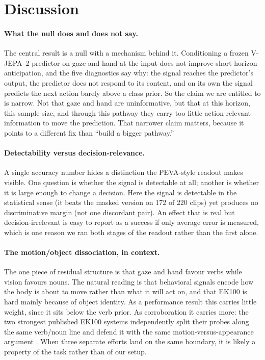 \section{Discussion}

\paragraph{What the null does and does not say.}
The central result is a null with a mechanism behind it. Conditioning a frozen
V-JEPA~2 predictor on gaze and hand at the input does not improve short-horizon
anticipation, and the five diagnostics say why: the signal reaches the
predictor's output, the predictor does not respond to its content, and on its own
the signal predicts the next action barely above a class prior. So the claim we
are entitled to is narrow. Not that gaze and hand are uninformative, but that at
this horizon, this sample size, and through this pathway they carry too little
action-relevant information to move the prediction. That narrower claim matters,
because it points to a different fix than ``build a bigger pathway.''

\paragraph{Detectability versus decision-relevance.}
A single accuracy number hides a distinction the PEVA-style readout makes
visible. One question is whether the signal is detectable at all; another is
whether it is large enough to change a decision. Here the signal is detectable in
the statistical sense (it beats the masked version on 172 of 220 clips) yet
produces no discriminative margin (not one discordant pair). An effect that is
real but decision-irrelevant is easy to report as a success if only average error
is measured, which is one reason we ran both stages of the readout rather than
the first alone.

\paragraph{The motion/object dissociation, in context.}
The one piece of residual structure is that gaze and hand favour verbs while
vision favours nouns. The natural reading is that behavioral signals encode how
the body is about to move rather than what it will act on, and that EK100 is hard
mainly because of object identity. As a performance result this carries little
weight, since it sits below the verb prior. As corroboration it carries more: the
two strongest published EK100 systems independently split their probes along the
same verb/noun line and defend it with the same motion-versus-appearance argument
\citep{chu2026jfaa, wang2026tapjepa}. When three separate efforts land on the
same boundary, it is likely a property of the task rather than of our setup.

